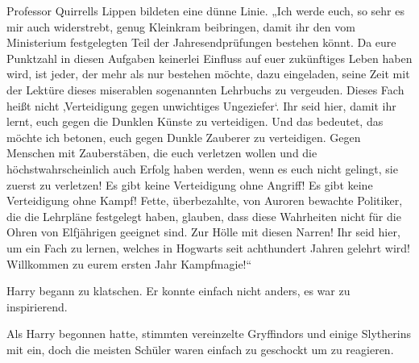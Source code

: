 Professor Quirrells Lippen bildeten eine dünne Linie. „Ich werde euch, so sehr es mir auch widerstrebt, genug Kleinkram beibringen, damit ihr den vom Ministerium festgelegten Teil der Jahresendprüfungen bestehen könnt. Da eure Punktzahl in diesen Aufgaben keinerlei Einfluss auf euer zukünftiges Leben haben wird, ist jeder, der mehr als nur bestehen möchte, dazu eingeladen, seine Zeit mit der Lektüre dieses miserablen sogenannten Lehrbuchs zu vergeuden. Dieses Fach heißt nicht ‚Verteidigung gegen unwichtiges Ungeziefer‘. Ihr seid hier, damit ihr lernt, euch gegen die Dunklen Künste zu verteidigen. Und das bedeutet, das möchte ich betonen, euch gegen Dunkle Zauberer zu verteidigen. Gegen Menschen mit Zauberstäben, die euch verletzen wollen und die höchstwahrscheinlich auch Erfolg haben werden, wenn es euch nicht gelingt, sie zuerst zu verletzen! Es gibt keine Verteidigung ohne Angriff! Es gibt keine Verteidigung ohne Kampf! Fette, überbezahlte, von Auroren bewachte Politiker, die die Lehrpläne festgelegt haben, glauben, dass diese Wahrheiten nicht für die Ohren von Elfjährigen geeignet sind. Zur Hölle mit diesen Narren! Ihr seid hier, um ein Fach zu lernen, welches in Hogwarts seit achthundert Jahren gelehrt wird! Willkommen zu eurem ersten Jahr Kampfmagie!“

Harry begann zu klatschen. Er konnte einfach nicht anders, es war zu inspirierend.

Als Harry begonnen hatte, stimmten vereinzelte Gryffindors und einige Slytherins mit ein, doch die meisten Schüler waren einfach zu geschockt um zu reagieren.

